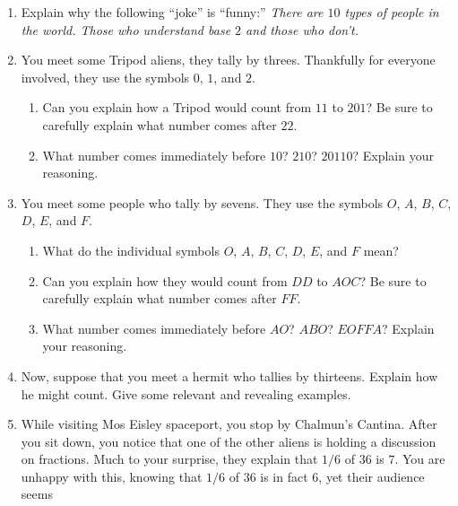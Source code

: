 \begin{problems}
\begin{enumerate}
\item Explain why the following ``joke'' is ``funny:'' \textit{There
  are $10$ types of people in the world. Those who understand base $2$
  and those who don't.}
\item You meet some Tripod aliens, they tally by threes. Thankfully
  for everyone involved, they use the symbols $0$, $1$, and $2$. 
\begin{enumerate}
\item Can you explain how a Tripod would count from $11$ to $201$? Be
  sure to carefully explain what number comes after $22$.
\item What number comes immediately before $10$?  $210$? $20110$?
  Explain your reasoning.
\end{enumerate}
\item You meet some people who tally by sevens. They use the symbols
  $O$, $A$, $B$, $C$, $D$, $E$, and $F$. 
\begin{enumerate}
\item What do the individual symbols $O$, $A$, $B$, $C$, $D$, $E$, and
  $F$ mean?
\item Can you explain how they would count from $DD$ to $AOC$? Be sure
  to carefully explain what number comes after $FF$.
\item What number comes immediately before $AO$?  $ABO$? $EOFFA$?
  Explain your reasoning.
\end{enumerate}
\item Now, suppose that you meet a hermit who tallies by
  thirteens. Explain how he might count. Give some relevant and
  revealing examples.
\item While visiting Mos Eisley spaceport, you stop by Chalmun's
  Cantina. After you sit down, you notice that one of the other aliens
  is holding a discussion on fractions. Much to your surprise, they
  explain that $1/6$ of $36$ is $7$. You are unhappy with this,
  knowing that $1/6$ of $36$ is in fact $6$, yet their audience seems

\end{enumerate}
\end{problems}

